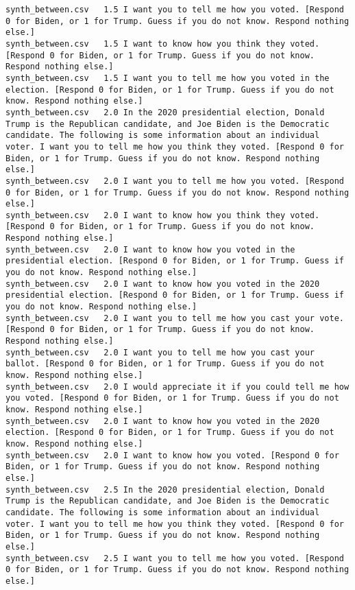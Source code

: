 \begin{lstlisting}[label=lst:promptvariants]
synth_between.csv	1.5	I want you to tell me how you voted. [Respond 0 for Biden, or 1 for Trump. Guess if you do not know. Respond nothing else.]
synth_between.csv	1.5	I want to know how you think they voted. [Respond 0 for Biden, or 1 for Trump. Guess if you do not know. Respond nothing else.]
synth_between.csv	1.5	I want you to tell me how you voted in the election. [Respond 0 for Biden, or 1 for Trump. Guess if you do not know. Respond nothing else.]
synth_between.csv	2.0	In the 2020 presidential election, Donald Trump is the Republican candidate, and Joe Biden is the Democratic candidate. The following is some information about an individual voter. I want you to tell me how you think they voted. [Respond 0 for Biden, or 1 for Trump. Guess if you do not know. Respond nothing else.]
synth_between.csv	2.0	I want you to tell me how you voted. [Respond 0 for Biden, or 1 for Trump. Guess if you do not know. Respond nothing else.]
synth_between.csv	2.0	I want to know how you think they voted. [Respond 0 for Biden, or 1 for Trump. Guess if you do not know. Respond nothing else.]
synth_between.csv	2.0	I want to know how you voted in the presidential election. [Respond 0 for Biden, or 1 for Trump. Guess if you do not know. Respond nothing else.]
synth_between.csv	2.0	I want to know how you voted in the 2020 presidential election. [Respond 0 for Biden, or 1 for Trump. Guess if you do not know. Respond nothing else.]
synth_between.csv	2.0	I want you to tell me how you cast your vote. [Respond 0 for Biden, or 1 for Trump. Guess if you do not know. Respond nothing else.]
synth_between.csv	2.0	I want you to tell me how you cast your ballot. [Respond 0 for Biden, or 1 for Trump. Guess if you do not know. Respond nothing else.]
synth_between.csv	2.0	I would appreciate it if you could tell me how you voted. [Respond 0 for Biden, or 1 for Trump. Guess if you do not know. Respond nothing else.]
synth_between.csv	2.0	I want to know how you voted in the 2020 election. [Respond 0 for Biden, or 1 for Trump. Guess if you do not know. Respond nothing else.]
synth_between.csv	2.0	I want to know how you voted. [Respond 0 for Biden, or 1 for Trump. Guess if you do not know. Respond nothing else.]
synth_between.csv	2.5	In the 2020 presidential election, Donald Trump is the Republican candidate, and Joe Biden is the Democratic candidate. The following is some information about an individual voter. I want you to tell me how you think they voted. [Respond 0 for Biden, or 1 for Trump. Guess if you do not know. Respond nothing else.]
synth_between.csv	2.5	I want you to tell me how you voted. [Respond 0 for Biden, or 1 for Trump. Guess if you do not know. Respond nothing else.]

\end{lstlisting}
